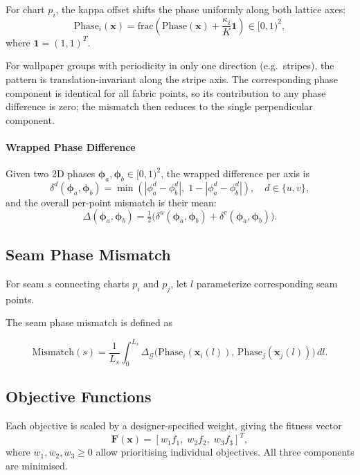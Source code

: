 \documentclass[runningheads]{llncs}
\begin{document}
For chart $p_i$, the kappa offset shifts the phase uniformly along both lattice axes:
\[
\mathrm{Phase}_i(\mathbf{x}) =
\mathrm{frac}\!\left(\mathrm{Phase}(\mathbf{x}) + \frac{\kappa_i}{K}\mathbf{1}\right) \in [0,1)^2,
\]
where $\mathbf{1} = (1,1)^T$.

For wallpaper groups with periodicity in only one direction (e.g.\ stripes),
the pattern is translation-invariant along the stripe axis.
The corresponding phase component is identical for all fabric points,
so its contribution to any phase difference is zero;
the mismatch then reduces to the single perpendicular component.

\paragraph{Wrapped Phase Difference}

Given two 2D phases $\boldsymbol{\phi}_a, \boldsymbol{\phi}_b \in [0,1)^2$,
the wrapped difference per axis is
\[
\delta^d(\boldsymbol{\phi}_a, \boldsymbol{\phi}_b)
= \min\!\left(|\phi_a^d - \phi_b^d|,\; 1 - |\phi_a^d - \phi_b^d|\right),
\quad d \in \{u, v\},
\]
and the overall per-point mismatch is their mean:
\[
\Delta(\boldsymbol{\phi}_a, \boldsymbol{\phi}_b)
= \tfrac{1}{2}\bigl(
    \delta^u(\boldsymbol{\phi}_a, \boldsymbol{\phi}_b)
  + \delta^v(\boldsymbol{\phi}_a, \boldsymbol{\phi}_b)
\bigr).
\]

\subsection{Seam Phase Mismatch}

For seam $s$ connecting charts $p_i$ and $p_j$,
let $l$ parameterize corresponding seam points.

The seam phase mismatch is defined as

\[
\mathrm{Mismatch}(s)
=
\frac{1}{L_s}
\int_0^{L_s}
\Delta_{\mathcal{G}}\!\bigl(
\mathrm{Phase}_i(\mathbf{x}_i(l)),\,
\mathrm{Phase}_j(\mathbf{x}_j(l))
\bigr)
\, dl.
\]

\subsection{Objective Functions}

Each objective is scaled by a designer-specified weight, giving the fitness vector
\[
\mathbf{F}(\mathbf{x}) = [w_1 f_1,\; w_2 f_2,\; w_3 f_3]^T,
\]
where $w_1, w_2, w_3 \geq 0$ allow prioritising individual objectives.
All three components are minimised.
\end{document}
